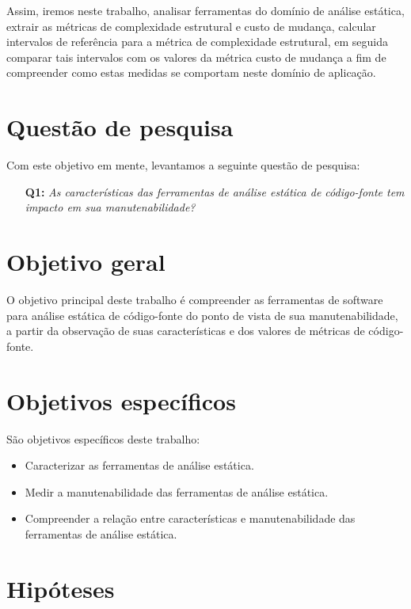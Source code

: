 Assim, iremos neste trabalho, analisar ferramentas do domínio de análise
estática, extrair as métricas de complexidade estrutural e custo de mudança,
calcular intervalos de referência para a métrica de complexidade estrutural, em
seguida comparar tais intervalos com os valores da métrica custo de mudança a
fim de compreender como estas medidas se comportam neste domínio de aplicação.

\section{Questão de pesquisa}

Com este objetivo em mente, levantamos a seguinte questão de pesquisa:

\begin{enumerate}
  \item [{\bf Q1:}] {\em As características das ferramentas de análise estática
  de código-fonte tem impacto em sua manutenabilidade?}
\end{enumerate}

\section{Objetivo geral}

O objetivo principal deste trabalho é compreender as ferramentas de software
para análise estática de código-fonte do ponto de vista de sua
manutenabilidade, a partir da observação de suas características e dos valores
de métricas de código-fonte.

\section{Objetivos específicos}

São objetivos específicos deste trabalho:

\begin{itemize}
  \item Caracterizar as ferramentas de análise estática.
  \item Medir a manutenabilidade das ferramentas de análise estática.
  \item Compreender a relação entre características e manutenabilidade
        das ferramentas de análise estática.
\end{itemize}

\section{Hipóteses} \label{hipoteses}

